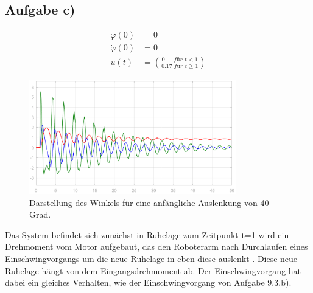 \documentclass[10pt]{scrartcl}
\begin{document}
\subsection{Aufgabe c)}
\begin{align}
\varphi  (0) &= 0 \\
\dot \varphi (0) &= 0 \\
u(t)  &= \binom{0\,\,\,\,\,\,\,\,\, für\,\, t<1}{0.17\,\, für\,\, t \geq 1}
\end{align}
\begin{figure}[H]
	\centering
	\includegraphics[width=0.8\textwidth]{9c}
	\caption{Darstellung des Winkels für eine anfängliche Auslenkung von 40 Grad. }
	\label{img:grafik-dummy}
\end{figure}
Das System befindet sich zunächst in Ruhelage
zum Zeitpunkt t=1 wird ein Drehmoment vom Motor aufgebaut,
das den Roboterarm nach Durchlaufen eines Einschwingvorgangs 
um die neue Ruhelage in eben diese auslenkt . Diese neue Ruhelage hängt von dem Eingangsdrehmoment ab. Der Einschwingvorgang hat dabei ein gleiches Verhalten, wie der Einschwingvorgang von Aufgabe 9.3.b). 


%





\end{document}

